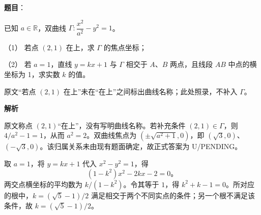 \begin{answer}

\textbf{题目}：

已知 $a\in\mathbb R$，双曲线 $\Gamma:\dfrac{x^2}{a^2}-y^2=1$。

（1） 若点 $(2,1)$ 在上，求 $\Gamma$ 的焦点坐标；

（2） 若 $a=1$，直线 $y=kx+1$ 与 $\Gamma$ 相交于 $A\text{、}B$ 两点，且线段 $AB$ 中点的横坐标为 1，求实数 $k$ 的值。

\begin{gktip}
原文“若点 $(2,1)$ 在上”未在“在上”之间标出曲线名称；此处照录，不补入 $\Gamma$。
\end{gktip}

\textbf{解析}


原文称点 $(2,1)$“在上”，没有写明曲线名称。若补充条件 $(2,1)\in\Gamma$，则 $4/a^2-1=1$，从而 $a^2=2$。双曲线焦点为 $(\pm\sqrt{a^2+1},0)$，即 $(\sqrt3,0)$、$(-\sqrt3,0)$。该归属关系未由现有题面确定，故正式答案为 U/PENDING。


取 $a=1$，将 $y=kx+1$ 代入 $x^2-y^2=1$，得
\nopagebreak[4]
\[
(1-k^2)x^2-2kx-2=0\mbox{。}
\]
两交点横坐标的平均数为 $k/(1-k^2)$。令其等于 $1$，得 $k^2+k-1=0$。所对应的根中，$k=(\sqrt5-1)/2$ 满足相交于两个不同实点的条件；另一个根不满足该条件，故 $k=(\sqrt5-1)/2$。



\end{answer}
